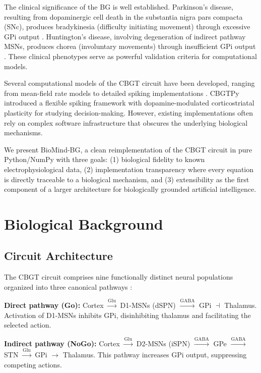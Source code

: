 \documentclass[11pt,a4paper]{article}
\begin{document}
The clinical significance of the BG is well established. Parkinson's disease, resulting from dopaminergic cell death in the substantia nigra pars compacta (SNc), produces bradykinesia (difficulty initiating movement) through excessive GPi output \citep{delong1990}. Huntington's disease, involving degeneration of indirect pathway MSNs, produces chorea (involuntary movements) through insufficient GPi output \citep{albin1989}. These clinical phenotypes serve as powerful validation criteria for computational models.

Several computational models of the CBGT circuit have been developed, ranging from mean-field rate models \citep{gurney2001} to detailed spiking implementations \citep{humphries2006}. CBGTPy \citep{dunovan2019} introduced a flexible spiking framework with dopamine-modulated corticostriatal plasticity for studying decision-making. However, existing implementations often rely on complex software infrastructure that obscures the underlying biological mechanisms.

We present BioMind-BG, a clean reimplementation of the CBGT circuit in pure Python/NumPy with three goals: (1) biological fidelity to known electrophysiological data, (2) implementation transparency where every equation is directly traceable to a biological mechanism, and (3) extensibility as the first component of a larger architecture for biologically grounded artificial intelligence.

\section{Biological Background}

\subsection{Circuit Architecture}

The CBGT circuit comprises nine functionally distinct neural populations organized into three canonical pathways \citep{alexander1986}:

\textbf{Direct pathway (Go):} Cortex $\xrightarrow{\text{Glu}}$ D1-MSNs (dSPN) $\xrightarrow{\text{GABA}}$ GPi $\dashv$ Thalamus. Activation of D1-MSNs inhibits GPi, disinhibiting thalamus and facilitating the selected action.

\textbf{Indirect pathway (NoGo):} Cortex $\xrightarrow{\text{Glu}}$ D2-MSNs (iSPN) $\xrightarrow{\text{GABA}}$ GPe $\xrightarrow{\text{GABA}}$ STN $\xrightarrow{\text{Glu}}$ GPi $\rightarrow$ Thalamus. This pathway increases GPi output, suppressing competing actions.
\end{document}
